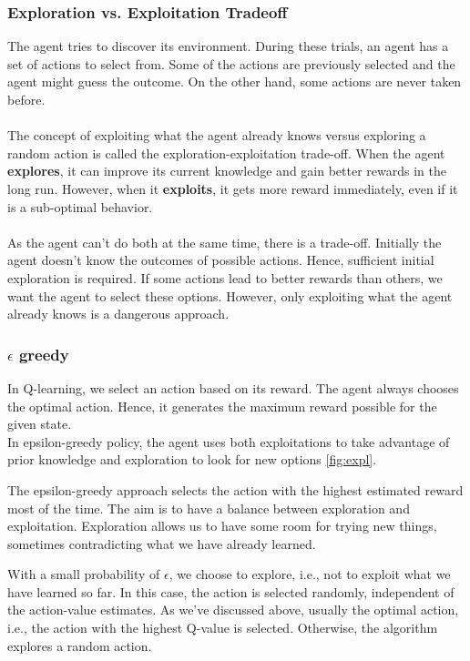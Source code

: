 \documentclass{article}
\begin{document}
\subsubsection{Exploration vs. Exploitation Tradeoff}
The agent tries to discover its environment. During these trials, an agent has a set of actions to select from. Some of the actions are previously selected and the agent might guess the outcome. On the other hand, some actions are never taken before.\\ \\
The concept of exploiting what the agent already knows versus exploring a random action is called the exploration-exploitation trade-off.
When the agent \textbf{explores}, it can improve its current knowledge and gain better rewards in the long run. However, when it \textbf{exploits}, it gets more reward immediately, even if it is a sub-optimal behavior.  \\ \\
As the agent can’t do both at the same time, there is a trade-off. Initially the agent doesn’t know the outcomes of possible actions. Hence, sufficient initial exploration is required. If some actions lead to better rewards than others, we want the agent to select these options. However, only exploiting what the agent already knows is a dangerous approach.

\subsubsection{$\epsilon$ greedy}
In Q-learning, we select an action based on its reward. The agent always chooses the optimal action. Hence, it generates the maximum reward possible for the given state.\\
In epsilon-greedy policy, the agent uses both exploitations to take advantage of prior knowledge and exploration to look for new options \ref{fig:expl}.

The epsilon-greedy approach selects the action with the highest estimated reward most of the time. The aim is to have a balance between exploration and exploitation. Exploration allows us to have some room for trying new things, sometimes contradicting what we have already learned.  

With a small probability of $\epsilon$, we choose to explore, i.e., not to exploit what we have learned so far. In this case, the action is selected randomly, independent of the action-value estimates.
As we’ve discussed above, usually the optimal action, i.e., the action with the highest Q-value is selected. Otherwise, the algorithm explores a random action.
\end{document}
